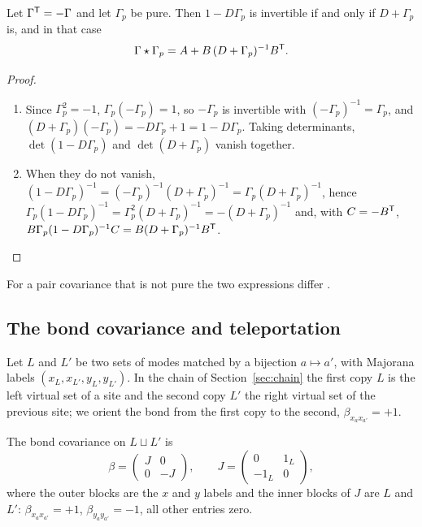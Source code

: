\begin{theorem}\label{thm:pure-bond}
Let $\Gamma^{\mathsf T}=-\Gamma$ and let $\Gamma_p$ be pure. Then $1-D\Gamma_p$ is invertible
if and only if $D+\Gamma_p$ is, and in that case
\[
 \Gamma\star\Gamma_p=A+B\,(D+\Gamma_p)^{-1}B^{\mathsf T} .
\]
\end{theorem}
\begin{proof}
\begin{enumerate}
\item[(a)] Since $\Gamma_p^2=-1$, $\Gamma_p(-\Gamma_p)=1$, so $-\Gamma_p$ is invertible
with $(-\Gamma_p)^{-1}=\Gamma_p$, and
$(D+\Gamma_p)(-\Gamma_p)=-D\Gamma_p+1=1-D\Gamma_p$. Taking determinants, $\det(1-D\Gamma_p)$
and $\det(D+\Gamma_p)$ vanish together.
\item[(b)] When they do not vanish,
$(1-D\Gamma_p)^{-1}=(-\Gamma_p)^{-1}(D+\Gamma_p)^{-1}=\Gamma_p(D+\Gamma_p)^{-1}$, hence
$\Gamma_p(1-D\Gamma_p)^{-1}=\Gamma_p^2(D+\Gamma_p)^{-1}=-(D+\Gamma_p)^{-1}$ and, with
$C=-B^{\mathsf T}$, $B\Gamma_p(1-D\Gamma_p)^{-1}C=B(D+\Gamma_p)^{-1}B^{\mathsf T}$.
\end{enumerate}
\end{proof}
For a pair covariance that is not pure the two expressions differ .

\subsection{The bond covariance and teleportation}
Let $L$ and $L'$ be two sets of modes matched by a bijection $a\mapsto a'$, with
Majorana labels $(x_L,x_{L'},y_L,y_{L'})$. In the chain of Section~\ref{sec:chain} the
first copy $L$ is the left virtual set of a site and the second copy $L'$ the right
virtual set of the previous site; we orient the bond from the first copy to the second,
$\beta_{x_ax_{a'}}=+1$.

\begin{definition}\label{def:bond}
The bond covariance on $L\sqcup L'$ is
\[
 \beta=\begin{pmatrix}J&0\\0&-J\end{pmatrix},\qquad
 J=\begin{pmatrix}0&1_L\\-1_L&0\end{pmatrix},
\]
where the outer blocks are the $x$ and $y$ labels and the inner blocks of $J$ are
$L$ and $L'$: $\beta_{x_ax_{a'}}=+1$, $\beta_{y_ay_{a'}}=-1$, all other entries zero.
\end{definition}

